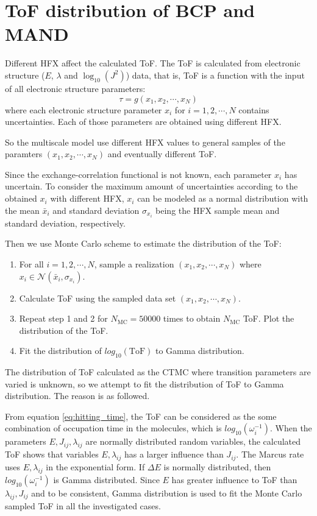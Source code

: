 \documentclass[letterpaper,12pt]{article}
\begin{document}
\section{ToF distribution of BCP and MAND}
Different HFX affect the calculated ToF. 
The ToF is calculated from electronic structure ($E$, $\lambda$ and $\log_{10}(J^2)$) data, that is, ToF is a function with the input of all electronic structure parameters:
\begin{equation}
    \tau = g(x_1, x_2, \cdots, x_N)
\end{equation}
where each electronic structure parameter $x_i$ for $i=1,2,\cdots,N$ contains uncertainties. 
Each of those parameters are obtained using different HFX. 

So the multiscale model use different HFX values to general samples of the paramters $(x_1, x_2, \cdots, x_N)$ and eventually different ToF. 

Since the exchange-correlation functional is not known, each parameter $x_i$ has uncertain. 
To consider the maximum amount of uncertainties according to the obtained $x_i$ with different HFX, $x_i$ can be modeled as a normal distribution with the mean $\bar{x}_i$ and standard deviation $\sigma_{x_i}$ being the HFX sample mean and standard deviation, respectively.

Then we use Monte Carlo scheme to estimate the distribution of the ToF:
\begin{enumerate}
\item For all $i=1,2,\cdots, N$, sample a realization $(x_1, x_2,\cdots, x_N)$ where $x_i \in \mathcal{N}(\bar{x}_i, \sigma_{x_i})$. 
\item Calculate ToF using the sampled data set $(x_1, x_2,\cdots, x_N)$. 
\item Repeat step 1 and 2 for $N_\text{MC} = 50000$ times to obtain $N_\text{MC}$ ToF. Plot the distribution of the ToF.
\item Fit the distribution of $log_{10}(\text{ToF})$ to Gamma distribution.
\end{enumerate}

The distribution of ToF calculated as the CTMC where transition parameters are varied is unknown, so we attempt to fit the distribution of ToF to Gamma distribution. The reason is as followed.

From equation \ref{eq:hitting_time}, the ToF can be considered as the some combination of occupation time in the molecules, which is $log_{10}(\omega_{i}^{-1})$. 
When the parameters $E, J_{ij}, \lambda_{ij}$ are normally distributed random variables, the calculated ToF shows that variables $E,\lambda_{ij}$ has a larger influence than $J_{ij}$. 
The Marcus rate uses $E,\lambda_{ij}$ in the exponential form. If $\Delta E$ is normally distributed, then $log_{10}(\omega_{i}^{-1})$ is Gamma distributed. 
Since $E$ has greater influence to ToF than $\lambda_{ij}, J_{ij}$ and to be consistent, Gamma distribution is used to fit the Monte Carlo sampled ToF in all the investigated cases.
\end{document}
